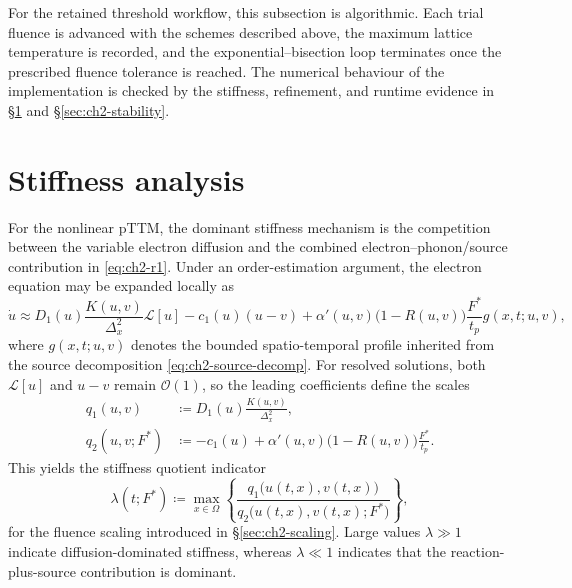 For the retained threshold workflow, this subsection is algorithmic. Each trial fluence is advanced with the schemes described above, the maximum lattice temperature is recorded, and the exponential--bisection loop terminates once the prescribed fluence tolerance is reached. The numerical behaviour of the implementation is checked by the stiffness, refinement, and runtime evidence in \S\ref{sec:ch2-stiffness} and \S\ref{sec:ch2-stability}.

\section{Stiffness analysis}
\label{sec:ch2-stiffness}

For the nonlinear pTTM, the dominant stiffness mechanism is the competition between the variable electron diffusion and the combined electron--phonon/source contribution in \eqref{eq:ch2-r1}.
Under an order-estimation argument, the electron equation may be expanded locally as
\begin{equation}
    \dot{u}
    \approx
    D_1(u)\frac{K(u,v)}{\Delta_x^2}\mathcal{L}[u]
    -
    c_1(u)(u-v)
    +
    \alpha'(u,v)\bigl(1-R(u,v)\bigr)\frac{F^*}{t_p} g(x,t;u,v),
    \label{eq:ch2-stiffness-expansion}
\end{equation}
where \(g(x,t;u,v)\) denotes the bounded spatio-temporal profile inherited from the source decomposition \eqref{eq:ch2-source-decomp}. For resolved solutions, both \(\mathcal{L}[u]\) and \(u-v\) remain \(\mathcal{O}(1)\), so the leading coefficients define the scales
\begin{subequations}\label{eq:ch2-stiffness-terms}
    \begin{align}
        q_1(u,v)
         & \coloneqq
        D_1(u)\frac{K(u,v)}{\Delta_x^2},
        \label{eq:ch2-stiffness-terms-a} \\
        q_2(u,v;F^*)
         & \coloneqq
        -c_1(u)
        +
        \alpha'(u,v)\bigl(1-R(u,v)\bigr)\frac{F^*}{t_p}.
        \label{eq:ch2-stiffness-terms-b}
    \end{align}
\end{subequations}
This yields the stiffness quotient indicator
\begin{equation}
    \lambda(t;F^*)
    \coloneqq
    \max_{x \in \Omega}
    \left\{
    \frac{q_1\bigl(u(t,x),v(t,x)\bigr)}{q_2\bigl(u(t,x),v(t,x);F^*\bigr)}
    \right\},
    \label{eq:ch2-stiffness-ratio}
\end{equation}
for the fluence scaling introduced in \S\ref{sec:ch2-scaling}. Large values \(\lambda \gg 1\) indicate diffusion-dominated stiffness, whereas \(\lambda \ll 1\) indicates that the reaction-plus-source contribution is dominant.

